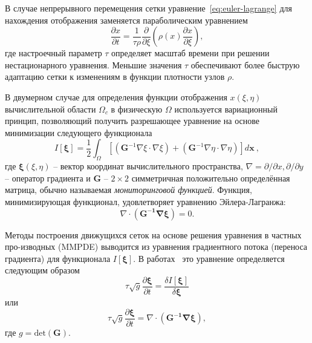 В случае непрерывного перемещения сетки уравнение~\eqref{eq:euler-lagrange} для нахождения отображения  заменяется параболическим уравнением~\cite{huang_practical_2001}
\begin{equation}
\frac{\partial x}{\partial t} = \frac{1}{\tau \rho}\frac{\partial}{\partial \xi}\left(\rho(x)\frac{\partial x}{\partial \xi} \right),
\label{eq:MMPDE5}
\end{equation} 
где настроечный параметр  $\tau$ определяет масштаб времени при решении нестационарного уравнения. Меньшие значения $\tau$ обеспечивают более быструю адаптацию сетки к изменениям в функции плотности узлов $\rho$. 

В двумерном случае для определения функции отображения  $x(\xi, \eta)$ вычислительной области $\Omega_c$  в физическую $\Omega$  используется вариационный принцип, позволяющий получить разрешающее уравнение на основе минимизации следующего функционала~\cite{huang_moving_1998, henderson1997nonlinear}
\begin{equation}\label{eq:functional2d}
I[\boldsymbol\xi] = \frac{1}{2} \int_{\Omega}\left[\left(\mathbf{G}^{-1}\nabla\xi\cdot\nabla\xi\right)+\left(\mathbf{G}^{-1}\nabla\eta\cdot\nabla\eta\right)\right]d\mathbf{x}\ ,
\end{equation}
где  $\boldsymbol{\xi}(\xi, \eta)$ – вектор координат вычислительного пространства, $\nabla = \partial/\partial x, \partial/\partial y$   – оператор градиента и $\mathbf{G}$  –   $2\times2$ симметричная положительно определённая матрица, обычно называемая \textit{мониторинговой функцией}. Функция, минимизирующая функционал, удовлетворяет уравнению Эйлера-Лагранжа:
\begin{equation}
\nabla \cdot \left(\mathbf{G^{-1}\nabla \boldsymbol\xi}\right) = 0.
\end{equation}

Методы построения движущихся сеток на основе решения уравнения в частных про-изводных (MMPDE) выводится из уравнения градиентного потока (переноса градиента) для функционала $I[\boldsymbol\xi]$. В работах~\cite{huang_moving_1998, henderson1997nonlinear} это уравнение определяется следующим образом
\begin{equation}
\tau \sqrt{g} \frac{\partial \boldsymbol\xi}{\partial t} = \frac{\delta I[\boldsymbol\xi]}{\delta \boldsymbol\xi}
\end{equation}
или
\begin{equation}\label{eq:MMPDE}
\tau \sqrt{g} \frac{\partial \boldsymbol\xi}{\partial t} =\nabla \cdot \left(\mathbf{G^{-1}\nabla \boldsymbol\xi}\right),
\end{equation}
где $g =\mathrm{det}(\mathbf{G})$.

